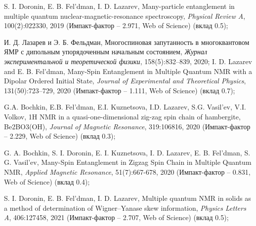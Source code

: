 \item
S. I. Doronin, E. B. Fel'dman,  I. D. Lazarev, Many-particle entanglement in multiple quantum nuclear-magnetic-resonance spectroscopy, \textit{Physical Review A}, 100(2):022330, 2019 (Импакт-фактор – 2.971, Web of Science) (вклад 0.5);


\item 
И. Д. Лазарев и Э. Б. Фельдман,
Многоспиновая запутанность в многоквантовом ЯМР с дипольным упорядоченным начальным состоянием,
\textit{Журнал экспериментальной и теоретической физики}, 158(5):832–839, 2020;
I. D. Lazarev and E. B. Fel'dman, 
Many-Spin Entanglement in Multiple Quantum NMR with a Dipolar Ordered Initial State,  
\textit{Journal of Experimental and Theoretical Physics}, 131(50):723–729, 2020 (Импакт-фактор – 1.111, Web of Science) (вклад 0.7);

\item
G.A. Bochkin, E.B. Fel'dman, E.I. Kuznetsova, I.D. Lazarev, S.G. Vasil'ev, V.I. Volkov, 1H NMR in a quasi-one-dimensional zig-zag spin chain of hambergite, Be2BO3(OH), \textit{Journal of Magnetic Resonance}, 319:106816, 2020 (Импакт-фактор – 2.229, Web of Science) (вклад 0.3);

\item
G. A. Bochkin, S. I. Doronin, E. I. Kuznetsova, I. D. Lazarev, E. B. Fel'dman, S. G. Vasil'ev, Many-Spin Entanglement in Zigzag Spin Chain in Multiple Quantum NMR, \textit{Applied Magnetic Resonance}, 51(7):667-678, 2020 (Импакт-фактор – 0.831, Web of Science) (вклад 0.4);

\item
S. I. Doronin, E. B. Fel'dman,  I. D. Lazarev, Multiple quantum NMR in solids as a method of determination of Wigner–Yanase skew information, \textit{Physics Letters A}, 406:127458, 2021 (Импакт-фактор – 2.707, Web of Science) (вклад 0.5);
